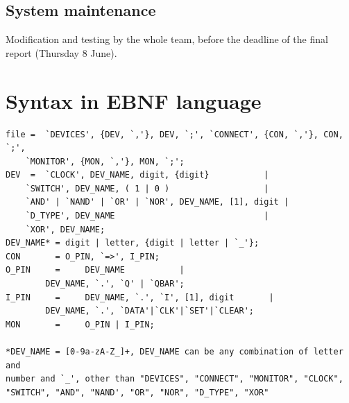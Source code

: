 \documentclass[12pt]{article}
\begin{document}
\subsection{System maintenance}
Modification and testing by the whole team, before the deadline of the final report (Thursday 8 June).

\section{Syntax in EBNF language}
\begin{lstlisting}[basicstyle=\small]
file =  `DEVICES', {DEV, `,'}, DEV, `;', `CONNECT', {CON, `,'}, CON, `;',
	`MONITOR', {MON, `,'}, MON, `;';
DEV  =  `CLOCK', DEV_NAME, digit, {digit}  			|
	`SWITCH', DEV_NAME, ( 1 | 0 )          			|
	`AND' | `NAND' | `OR' | `NOR', DEV_NAME, [1], digit	|
	`D_TYPE', DEV_NAME                  			|
	`XOR', DEV_NAME;
DEV_NAME* =	digit | letter, {digit | letter | `_'};
CON       =	O_PIN, `=>', I_PIN;
O_PIN     =  	DEV_NAME		   |
		DEV_NAME, `.', `Q' | `QBAR';
I_PIN     =  	DEV_NAME, `.', `I', [1], digit		 |
		DEV_NAME, `.', `DATA'|`CLK'|`SET'|`CLEAR';
MON       =     O_PIN | I_PIN;

*DEV_NAME = [0-9a-zA-Z_]+, DEV_NAME can be any combination of letter and 
number and `_', other than "DEVICES", "CONNECT", "MONITOR", "CLOCK", 
"SWITCH", "AND", "NAND', "OR", "NOR", "D_TYPE", "XOR"
\end{lstlisting}
\end{document}
